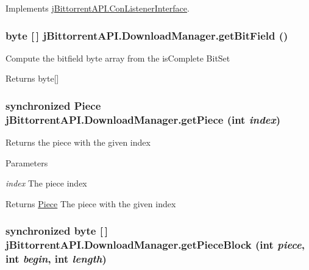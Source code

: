 Implements \hyperlink{interfacej_bittorrent_a_p_i_1_1_con_listener_interface_ae9112eed45ca89e112dbe8bc7aba6716}{jBittorrentAPI.ConListenerInterface}.\hypertarget{classj_bittorrent_a_p_i_1_1_download_manager_a04fb67e897432a490950863e2d9c7d32}{
\subsubsection[{getBitField}]{\setlength{\rightskip}{0pt plus 5cm}byte \mbox{[}$\,$\mbox{]} jBittorrentAPI.DownloadManager.getBitField ()}}
\label{classj_bittorrent_a_p_i_1_1_download_manager_a04fb67e897432a490950863e2d9c7d32}
Compute the bitfield byte array from the isComplete BitSet \begin{DoxyReturn}{Returns}
byte\mbox{[}\mbox{]} 
\end{DoxyReturn}
\hypertarget{classj_bittorrent_a_p_i_1_1_download_manager_a2c576788704ea89a2449e470fc02c955}{
\subsubsection[{getPiece}]{\setlength{\rightskip}{0pt plus 5cm}synchronized {\bf Piece} jBittorrentAPI.DownloadManager.getPiece (int {\em index})}}
\label{classj_bittorrent_a_p_i_1_1_download_manager_a2c576788704ea89a2449e470fc02c955}
Returns the piece with the given index 
\begin{DoxyParams}{Parameters}
\item[{\em index}]The piece index \end{DoxyParams}
\begin{DoxyReturn}{Returns}
\hyperlink{classj_bittorrent_a_p_i_1_1_piece}{Piece} The piece with the given index 
\end{DoxyReturn}
\hypertarget{classj_bittorrent_a_p_i_1_1_download_manager_ad1e35cf49af550e1a2c47cf6c573a0ec}{
\subsubsection[{getPieceBlock}]{\setlength{\rightskip}{0pt plus 5cm}synchronized byte \mbox{[}$\,$\mbox{]} jBittorrentAPI.DownloadManager.getPieceBlock (int {\em piece}, \/  int {\em begin}, \/  int {\em length})}}
